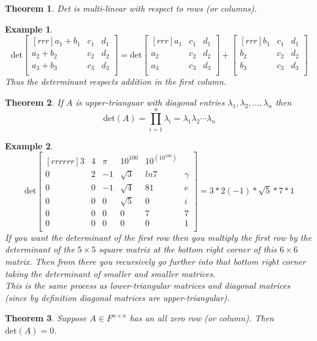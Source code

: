 \documentclass{report}
\newtheorem*{ex}{Example}
\newtheorem*{thrm}{Theorem}
\begin{document}
\begin{thrm}
Det is multi-linear with respect to rows (or columns).
\end{thrm}
\begin{ex}
\[ \mathrm{det}\begin{bmatrix}[rrr]a_1+b_1&c_1&d_1\\a_2+b_2&c_2&d_2\\a_3+b_3&c_3&d_3\\\end{bmatrix} = \mathrm{det}\begin{bmatrix}[rrr]a_1&c_1&d_1\\a_2&c_2&d_2\\a_3&c_3&d_3\\\end{bmatrix}+\begin{bmatrix}[rrr]b_1&c_1&d_1\\b_2&c_2&d_2\\b_3&c_3&d_3\\\end{bmatrix} \]
Thus the determinant respects addition in the first column.
\end{ex}
\begin{thrm}
If $A$ is upper-trianguar with diagonal entries $\lambda_1,\lambda_2,...,\lambda_n$ then
\[ \mathrm{det}(A)=\prod_{i=1}^n \lambda_i = \lambda_1 \lambda_2 \cdots \lambda_n \]
\end{thrm}
\begin{ex}
\[ \mathrm{det}\begin{bmatrix}[rrrrrr]3&4&\pi &10^{100} & 10^{(10^{100})}\\0&2&-1&\sqrt{3} & ln7&\gamma\\0&0&-1&\sqrt{4} & 81&e\\0&0&0&\sqrt{5}&0&i\\0&0&0&0&7&7\\0&0&0&0&0&1\\\end{bmatrix} = 3*2(-1)*\sqrt{5}*7*1 \]
If you want the determinant of the first row then you multiply the first row by the determinant of the $5\times 5$ square matrix at the bottom right corner of this $6 \times 6$ matrix. Then from there you recursively go further into that bottom right corner taking the determinant of smaller and smaller matrices.\\
This is the same process as lower-triangular matrices and diagonal matrices (since by definition diagonal matrices are upper-triangular).
\end{ex}
\begin{thrm}
Suppose $A\in F^{n\times n}$ has an all zero row (or column). Then $\mathrm{det}(A)=0$.
\end{thrm}
\end{document}
